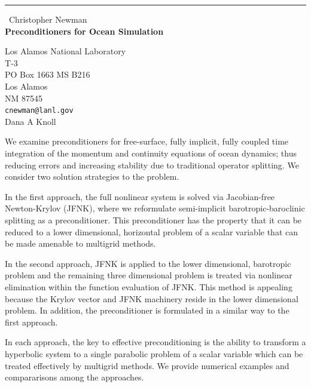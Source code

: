 \documentclass{report}
\begin{document}
\begin{center}
\rule{6in}{1pt} \
{\large Christopher Newman \\
{\bf Preconditioners for Ocean Simulation}}

Los Alamos National Laboratory \\ T-3 \\ PO Box 1663 MS B216 \\ Los Alamos \\ NM 87545
\\
{\tt cnewman@lanl.gov}\\
Dana A Knoll\end{center}

We examine preconditioners for free-surface, fully implicit, fully
coupled time integration of the momentum and
continuity equations of ocean dynamics;
thus reducing errors and increasing stability due to traditional operator splitting.
We consider two solution strategies to the problem.

In the first approach, the full nonlinear system is solved via
Jacobian-free Newton-Krylov (JFNK), where we reformulate semi-implicit
barotropic-baroclinic splitting as a preconditioner.
This preconditioner has the property that it can be reduced to a lower
dimensional, horizontal problem of a scalar variable that can
be made amenable to multigrid methods.

In the second approach, JFNK is applied to the lower dimensional,
barotropic problem and the remaining three dimensional problem is
treated via nonlinear elimination within the function evaluation of JFNK.
This method is appealing because
the Krylov vector and JFNK machinery reside in the lower dimensional problem.
In addition, the preconditioner is formulated in a similar way to the first approach.

In each approach, the key to effective preconditioning is the ability to
transform a hyperbolic system to
a single parabolic problem of a scalar variable
which can be treated effectively by multigrid methods.
We provide numerical examples and compararisons among the approaches.
\end{document}
